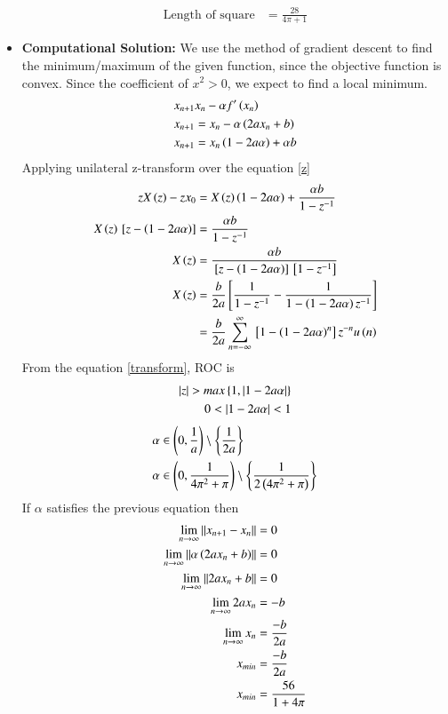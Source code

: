 \documentclass[journal]{IEEEtran}
\numberwithin{equation}{enumi}
\numberwithin{figure}{enumi}
\begin{document}
\begin{itemize}
\begin{align}
        \text{Length of square} &= \frac{28}{4\pi + 1}
    \end{align}
    \item \textbf{Computational Solution:}
    We use the method of gradient descent to find the minimum/maximum of the given function, since the objective function is convex. Since the coefficient of $x^2 > 0$, we expect to find a local minimum.
    \begin{align}
        x_{n + 1} & x_n - \alpha f^{\prime}\left(x_n\right)\\
        x_{n + 1} &= x_n - \alpha \left(2ax_n + b\right)\\
        x_{n + 1} &= x_n \left(1 - 2a\alpha\right) + \alpha b \label{z}
    \end{align}
    Applying unilateral z-transform over the equation \eqref{z}
    \begin{align}
        zX\left(z\right) - zx_0 &= X\left(z\right)\left(1 - 2a\alpha\right) + \frac{\alpha b}{1 - z^{-1}}\\
        X\left(z\right){}\left[z - \left(1 - 2a\alpha\right)\right] &= \frac{\alpha b}{1 - z^{-1}} \\
        X\left(z\right) &= \frac{\alpha b}{{}\left[z - \left(1 - 2a\alpha\right)\right] {}\left[1 - z^{-1}\right]}\\
        X\left(z\right) &= \frac{b}{2a} {}\left[\frac{1}{1 - z^{-1}} - \frac{1}{1 - \left(1 - 2a\alpha\right)z^{-1}}\right]\\
        &= \frac{b}{2a}\sum_{n = -\infty}^{\infty} {{}\left[1 - \left(1 - 2a\alpha\right)^n\right]z^{-n}}u\left(n\right) \label{transform}
    \end{align}
    From the equation \eqref{transform}, ROC is 
    \begin{align}
        \left\vert z\right\vert > max\left\{1, \left\vert1 - 2a\alpha\right\vert\right\}\\
        0 < \left\vert1 - 2a\alpha\right\vert < 1\\
    \end{align}
    \begin{align}
        \alpha &\in \left(0, \frac{1}{a}\right)\setminus \left\{\frac{1}{2a}\right\}\\
        \alpha &\in \left(0, \frac{1}{4\pi^2 + \pi}\right) \setminus \left\{\frac{1}{2\left(4\pi^2 + \pi\right)}\right\}
    \end{align}
    If $\alpha$ satisfies the previous equation then 
    \begin{align}
        \lim_{n \to \infty}{\left\lVert x_{n+1} - x_n\right\rVert} &= 0\\
        \lim_{n \to \infty}{\left\lVert\alpha\left(2ax_n + b\right)\right\rVert} &= 0\\
        \lim_{n \to \infty}{\left\lVert2ax_n + b\right\rVert} &= 0\\
        \lim_{n \to \infty}{2ax_n} &= -b\\
        \lim_{n \to \infty}{x_n} &= \frac{-b}{2a}\\
        x_{min} &= \frac{-b}{2a}\\
        x_{min} &= \frac{56}{1 + 4\pi}
    \end{align}
\end{itemize}
\end{document}

